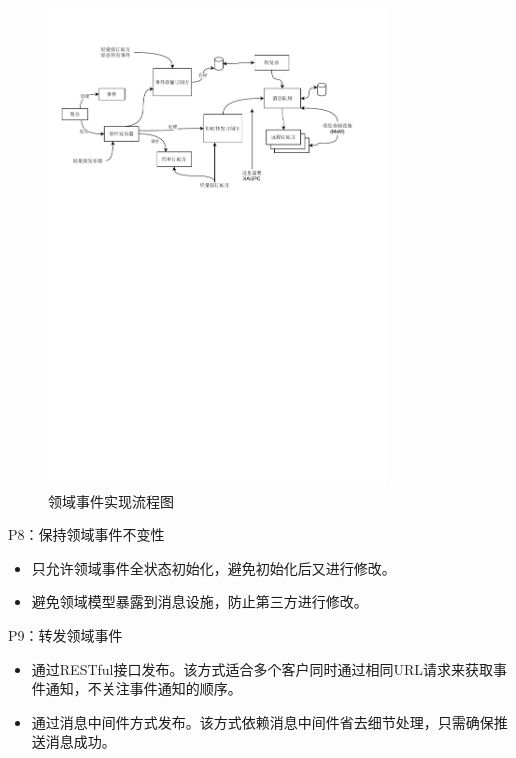 \begin{figure}[h] %
    \centering %
    \includegraphics[width=0.8\textwidth]{FIGs/chapter3/DomainEventPractice.pdf} %
    \caption{领域事件实现流程图\protect\footnotemark[1]} %
    \label{DomainEventPractice} %
\end{figure}%

P8：保持领域事件不变性
\begin{itemize}[leftmargin = 40pt]
    \item 只允许领域事件全状态初始化，避免初始化后又进行修改。
    \item 避免领域模型暴露到消息设施，防止第三方进行修改。
\end{itemize}

P9：转发领域事件
\begin{itemize}[leftmargin = 40pt]
    \item 通过RESTful接口发布。该方式适合多个客户同时通过相同URL请求来获取事件通知，不关注事件通知的顺序。
    \item 通过消息中间件方式发布。该方式依赖消息中间件省去细节处理，只需确保推送消息成功。
\end{itemize}

